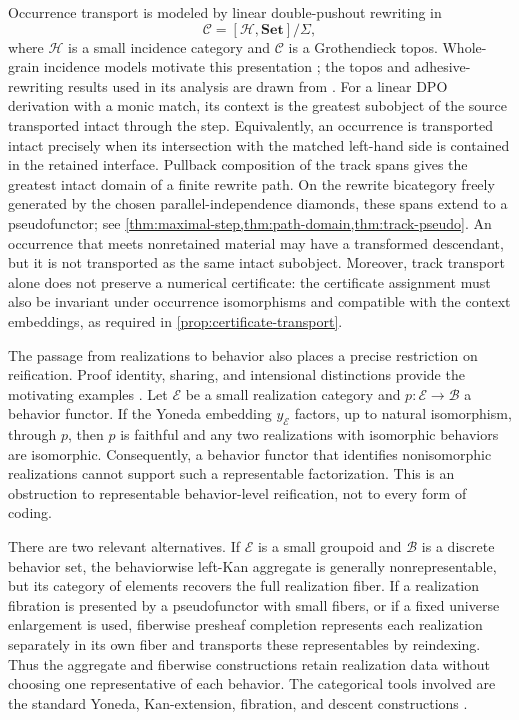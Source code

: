 \documentclass[12pt,a4paper,twoside]{extarticle}
\theoremstyle{compactplain}
\theoremstyle{compactdef}
\begin{document}
Occurrence transport is modeled by linear double-pushout rewriting in
\[
  \mathcal C=[\mathcal H,\mathbf{Set}]/\Sigma ,
\]
where \(\mathcal H\) is a small incidence category and \(\mathcal C\) is a
Grothendieck topos.  Whole-grain incidence models motivate this presentation
\cite{kock-petri}; the topos and adhesive-rewriting results used in its
analysis are drawn from
\cite{maclane-moerdijk,lack-sobocinski,behr-harmer-krivine,
zanasi-free-hypergraph,bonchi-rewriting-frobenius}.
For a linear DPO derivation with a monic match, its context is the greatest
subobject of the source transported intact through the step.  Equivalently, an
occurrence is transported intact precisely when its intersection with the
matched left-hand side is contained in the retained interface.  Pullback
composition of the track spans gives the greatest intact domain of a finite
rewrite path.  On the rewrite bicategory freely generated by the chosen
parallel-independence diamonds, these spans extend to a pseudofunctor; see
\cref{thm:maximal-step,thm:path-domain,thm:track-pseudo}.  An occurrence that
meets nonretained material may have a transformed descendant, but it is not
transported as the same intact subobject.  Moreover, track transport alone
does not preserve a numerical certificate: the certificate assignment must
also be invariant under occurrence isomorphisms and compatible with the
context embeddings, as required in \cref{prop:certificate-transport}.

The passage from realizations to behavior also places a precise restriction on
reification.  Proof identity, sharing, and intensional distinctions provide
the motivating examples
\cite{girard,strassburger,hasegawa,pfenning,hu-pientka}.
Let \(\mathcal E\) be a small realization category and
\(p:\mathcal E\to\mathcal B\) a behavior functor.  If the Yoneda embedding
\(y_{\mathcal E}\) factors, up to natural isomorphism, through \(p\), then
\(p\) is faithful and any two realizations with isomorphic behaviors are
isomorphic.  Consequently, a behavior functor that identifies nonisomorphic
realizations cannot support such a representable factorization.  This is an
obstruction to representable behavior-level reification, not to every form of
coding.

There are two relevant alternatives.  If \(\mathcal E\) is a small groupoid
and \(\mathcal B\) is a discrete behavior set, the behaviorwise left-Kan
aggregate is generally nonrepresentable, but its category of elements
recovers the full realization fiber.  If a realization fibration is presented
by a pseudofunctor with small fibers, or if a fixed universe enlargement is
used, fiberwise presheaf completion represents each realization separately in
its own fiber and transports these representables by reindexing.  Thus the
aggregate and fiberwise constructions retain realization data without choosing
one representative of each behavior.  The categorical tools involved are the
standard Yoneda, Kan-extension, fibration, and descent constructions
\cite{maclane,streicher,coquand-mannaa-ruch}.
\end{document}
